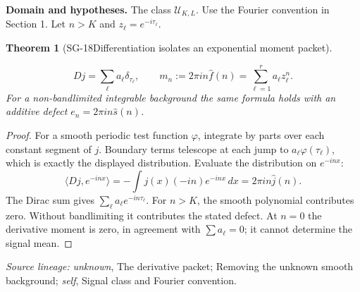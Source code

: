 \documentclass[11pt]{article}
\newtheorem{theorem}{Theorem}[section]
\theoremstyle{definition}\newtheorem{definition}[theorem]{Definition}
\theoremstyle{remark}\newtheorem{remark}[theorem]{Remark}
\begin{document}
\par{\small\textbf{Domain and hypotheses.} The class $\mathcal U_{K,L}$. Use the Fourier convention in Section 1. Let $n>K$ and $z_\ell=e^{-i\tau_\ell}$.}\par
\begin{theorem}[SG-18\quad Differentiation isolates an exponential moment packet]\label{SG-18}

\[
 Dj=\sum_\ell a_\ell\delta_{\tau_\ell},\qquad
 m_n:=2\pi in\widehat f(n)=\sum_{\ell=1}^ra_\ell z_\ell^n.
\]
For a non-bandlimited integrable background the same formula holds with
an additive defect $e_n=2\pi in\widehat s(n)$.

\end{theorem}
\begin{proof}

For a smooth periodic test function $\varphi$, integrate by parts over each
constant segment of $j$. Boundary terms telescope at each jump to
$a_\ell\varphi(\tau_\ell)$, which is exactly the displayed distribution.
Evaluate the distribution on $e^{-inx}$:
\[
 \langle Dj,e^{-inx}\rangle
 =-\int j(x)(-in)e^{-inx}\,dx
 =2\pi in\widehat j(n).
\]
The Dirac sum gives $\sum_\ell a_\ell e^{-in\tau_\ell}$.
For $n>K$, the smooth polynomial contributes zero. Without bandlimiting it
contributes the stated defect. At $n=0$ the derivative moment is zero, in
agreement with $\sum a_\ell=0$; it cannot determine the signal mean.

\end{proof}

\par{\small\color{Teal}\textit{Source lineage:} \textit{unknown}, The derivative packet; Removing the unknown smooth background; \textit{self}, Signal class and Fourier convention.}\par
\end{document}
